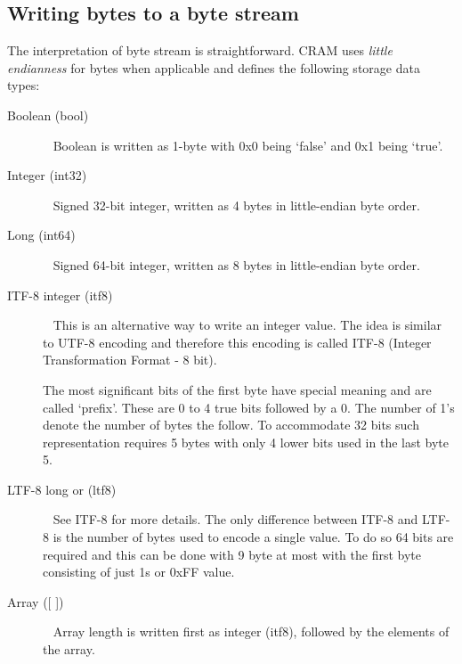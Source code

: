 \documentclass[a4paper]{article}
\begin{document}
\subsection{\textbf{Writing bytes to a byte stream}}

The interpretation of byte stream is straightforward. CRAM uses \emph{little endianness}
for bytes when applicable and defines the following storage data types:

\begin{description}

\item[Boolean (bool)]\ \newline
Boolean is written as 1-byte with 0x0 being `false' and 0x1 being `true'.

\item[Integer (int32)]\ \newline
Signed 32-bit integer, written as 4 bytes in little-endian byte order.

\item[Long (int64)]\ \newline
Signed 64-bit integer, written as 8 bytes in little-endian byte order.

\item[ITF-8 integer (itf8)]\ \newline
This is an alternative way to write an integer value. The idea is similar to UTF-8 
encoding and therefore this encoding is called ITF-8 (Integer Transformation Format 
- 8 bit). 

The most significant bits of the first byte have special meaning and are called 
`prefix'. These are 0 to 4 true bits followed by a 0. The number of 1's denote 
the number of bytes the follow. To accommodate 32 bits such representation requires 
5 bytes with only 4 lower bits used in the last byte 5.

\item[LTF-8 long or (ltf8)]\ \newline
See ITF-8 for more details. The only difference between ITF-8 and LTF-8 is the 
number of bytes used to encode a single value. To do so 64 bits are required and 
this can be done with 9 byte at most with the first byte consisting of just 1s 
or 0xFF value. 

\item[{Array ([ ])}]\ \newline
Array length is written first as integer (itf8), followed by the elements of the 
array. 
\end{description}
\end{document}
